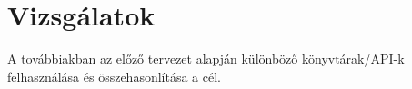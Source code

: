 
\section{Vizsg\'alatok}

A tov\'abbiakban az el\H oz\H o tervezet alapj\'an k\"ul\"onb\"oz\H o k\"onyvt\'arak/API-k felhaszn\'al\'asa \'es \"osszehasonl\'it\'asa a c\'el.


